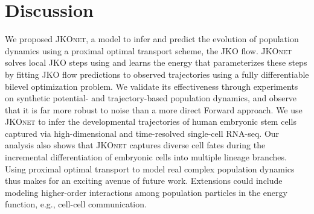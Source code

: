 \section{Discussion}
We proposed \textsc{JKOnet}, a model to infer and predict the evolution of population dynamics using a proximal optimal transport scheme, the \acrshort{JKO} flow.
\textsc{JKOnet} solves local \acrshort{JKO} steps using  and learns the energy that parameterizes these steps by fitting \acrshort{JKO} flow predictions to observed trajectories using a fully differentiable bilevel optimization problem.
We validate its effectiveness through experiments on synthetic potential- and trajectory-based population dynamics, and observe that it is far more robust to noise than a more direct Forward approach. We use \textsc{JKOnet} to infer the developmental trajectories of human embryonic stem cells captured via high-dimensional and time-resolved single-cell RNA-seq. 
Our analysis also shows that \textsc{JKOnet} captures diverse cell fates during the incremental differentiation of embryonic cells into multiple lineage branches.
Using proximal optimal transport to model real complex population dynamics thus makes for an exciting avenue of future work. Extensions could include modeling higher-order interactions among population particles in the energy function, e.g., cell-cell communication.
